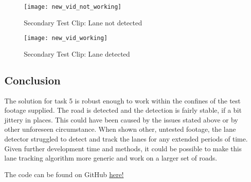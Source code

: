 \documentclass[conference]{IEEEtran}
\begin{document}
\begin{figure}[H]
\centerline{\texttt{[image: new\_vid\_not\_working]}}
\caption{Secondary Test Clip: Lane not detected}
\label{fig:new_vid_not_working}
\end{figure}

\begin{figure}[H]
\centerline{\texttt{[image: new\_vid\_working]}}
\caption{Secondary Test Clip: Lane detected}
\label{fig:new_vid_working}
\end{figure}

\subsection{Conclusion}

The solution for task 5 is robust enough to work within the confines of the test footage supplied. The road is detected and the detection is fairly stable, if a bit jittery in places. This could have been caused by the issues stated above or by other unforeseen circumstance. When shown other, untested footage, the lane detector struggled to detect and track the lanes for any extended periods of time. Given further development time and methods, it could be possible to make this lane tracking algorithm more generic and work on a larger set of roads. 




The code can be found on GitHub \href{https://github.com/LukeDWaller99/Aint308}{here!} 

\onecolumn
\end{document}
